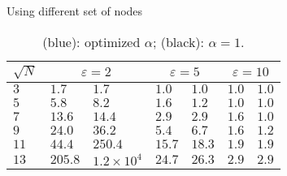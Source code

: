 \documentclass{beamer}
\begin{document}
\begin{frame}{Using different set of nodes}
  \begin{table}[hptb]
    \begin{center}
      \begin{tabular}{l||ll|ll|ll}
        \multicolumn{1}{c||}{$\sqrt{N}$} & 
	\multicolumn{2}{c|}{$\varepsilon = 2$} & 
	\multicolumn{2}{c|}{$\varepsilon = 5$} &
	\multicolumn{2}{c}{$\varepsilon = 10$}\\
        \hline \hline
	$3$ & {\color{blue}$1.7$} & $1.7$ & {\color{blue}$1.0$} & $1.0$ &
	{\color{blue}$1.0$} & $1.0$\\
	$5$ & {\color{blue}$5.8$} & $8.2$ & {\color{blue}$1.6$} & $1.2$ &
	{\color{blue}$1.0$} & $1.0$\\
	$7$ & {\color{blue}$13.6$} & $14.4$ & {\color{blue}$2.9$} & $2.9$ &
	{\color{blue}$1.6$} & $1.0$\\
	$9$ & {\color{blue}$24.0$} & $36.2$ & {\color{blue}$5.4$} & $6.7$ &
	{\color{blue}$1.6$} & $1.2$\\
	$11$ & {\color{blue}$44.4$} & $250.4$ & {\color{blue}$15.7$} & $18.3$ &
	{\color{blue}$1.9$} & $1.9$\\
	$13$ & {\color{blue}$205.8$} & $1.2\times 10^4$ & {\color{blue}$24.7$} &
	$26.3$ & {\color{blue}$2.9$} & $2.9$\\   
      \end{tabular}
    \end{center}
    \caption{{\color{blue}(blue)}: optimized $\alpha$; (black): $\alpha = 1$.}
  \end{table}
\end{frame}
\end{document}
